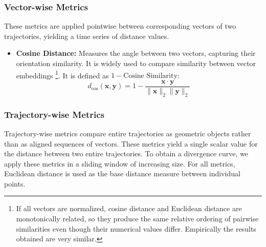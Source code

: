 \documentclass[a4paper,12pt]{article}
\begin{document}
    \subsubsection{Vector-wise Metrics}
    \label{sssec:methods_vector_metrics}
    These metrics are applied pointwise between corresponding vectors of two trajectories, yielding a time series of distance values.
    \begin{itemize}
        \item \textbf{Cosine Distance:} Measures the angle between two vectors, capturing their orientation similarity. It is widely used to compare similarity between vector embeddings \footnote{If all vectors are normalized, cosine distance and Euclidean distance are monotonically related, so they produce the same relative ordering of pairwise similarities even though their numerical values differ. Empirically the results obtained are very similar.}. It is defined as $1 - \text{Cosine Similarity}$:
        \begin{equation}
            d_{\text{cos}}(\mathbf{x}, \mathbf{y}) = 1 - \frac{\mathbf{x} \cdot \mathbf{y}}{\|\mathbf{x}\|_2 \|\mathbf{y}\|_2}
        \end{equation}
    \end{itemize}
 
    \subsubsection{Trajectory-wise Metrics}
    \label{sssec:methods_trajectory_metrics}
    Trajectory-wise metrics compare entire trajectories as geometric objects rather than as aligned sequences of vectors. These metrics yield a single scalar value for the distance between two entire trajectories. To obtain a divergence curve, we apply these metrics in a sliding window of increasing size. For all metrics, Euclidean distance is used as the base distance measure between individual points.
\end{document}
